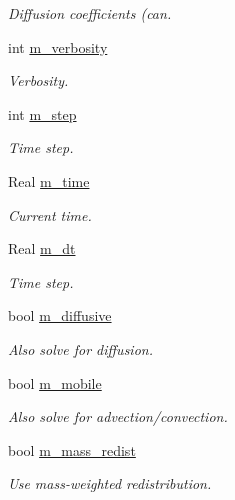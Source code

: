 \begin{DoxyCompactItemize}
\begin{DoxyCompactList}\small\item\em Diffusion coefficients (can. \end{DoxyCompactList}\item 
int \hyperlink{classcdr__solver_a79f63bdaae91aad5605c4d1694fe6f3f}{m\+\_\+verbosity}
\begin{DoxyCompactList}\small\item\em Verbosity. \end{DoxyCompactList}\item 
int \hyperlink{classcdr__solver_a8e8c679e6e0ccd9c4fc2320be138ec4b}{m\+\_\+step}
\begin{DoxyCompactList}\small\item\em Time step. \end{DoxyCompactList}\item 
Real \hyperlink{classcdr__solver_a95de10e60f0e15883eff645bac2ebe37}{m\+\_\+time}
\begin{DoxyCompactList}\small\item\em Current time. \end{DoxyCompactList}\item 
Real \hyperlink{classcdr__solver_a33b1498669b7481446b328d8d56a1f77}{m\+\_\+dt}
\begin{DoxyCompactList}\small\item\em Time step. \end{DoxyCompactList}\item 
bool \hyperlink{classcdr__solver_a6368305ae006773465b2cdcab7d48031}{m\+\_\+diffusive}
\begin{DoxyCompactList}\small\item\em Also solve for diffusion. \end{DoxyCompactList}\item 
bool \hyperlink{classcdr__solver_a30b3c7d43c7fcd45b06f4e6d4f0a7f80}{m\+\_\+mobile}
\begin{DoxyCompactList}\small\item\em Also solve for advection/convection. \end{DoxyCompactList}\item 
bool \hyperlink{classcdr__solver_aac342db383d9d907e262768444c6f647}{m\+\_\+mass\+\_\+redist}
\begin{DoxyCompactList}\small\item\em Use mass-\/weighted redistribution. \end{DoxyCompactList}\end{DoxyCompactItemize}


